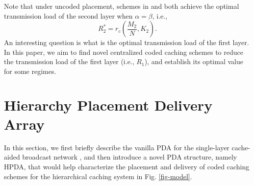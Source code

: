 \documentclass[onecolumn,10pt]{IEEEtran}
\theoremstyle{mythm}
\begin{document}



Note that under   uncoded placement, schemes in \cite{KNMD} and \cite[Section VI]{WWCY} both achieve the optimal transmission load of the second layer  when $\alpha=\beta$, i.e.,
$$R^*_2=r_c\left(\frac{  M_2}{  N},K_2\right).$$
An interesting question  is  what is the optimal  transmission load of the first layer. In this paper, we aim  to find novel centralized coded caching schemes  to reduce the transmission load of the first layer (i.e., $R_1$), and   establish its optimal value for some regimes.



\section{Hierarchy Placement Delivery Array}
\label{sec:HPDA}
In this section, we first briefly describe the vanilla PDA for the single-layer cache-aided broadcast network \cite{YCTC}, and then introduce a novel PDA structure, namely  HPDA, that would help characterize the placement and delivery of coded caching schemes for the hierarchical caching system in Fig. \ref{fig-model}.
\end{document}
